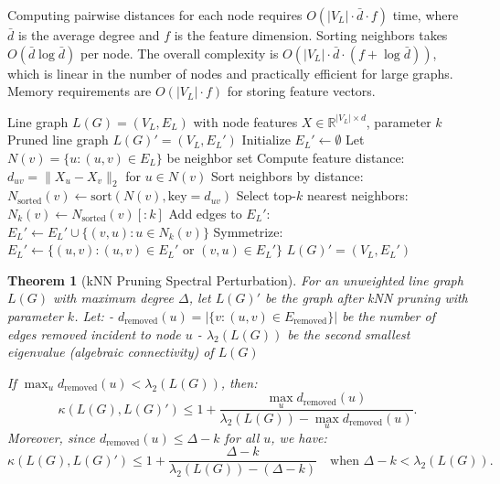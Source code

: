 \documentclass[pdflatex,sn-mathphys-num]{sn-jnl}%
\theoremstyle{thmstyleone}%
\newtheorem{theorem}{Theorem}%
\theoremstyle{thmstyletwo}%
\theoremstyle{thmstylethree}%
\theoremstyle{plain} %
\theoremstyle{definition} %
\theoremstyle{remark} %
\theoremstyle{plain} %
\begin{document}
Computing pairwise distances for each node requires $O(|V_L| \cdot \bar{d} \cdot f)$ time, where $\bar{d}$ is the average degree and $f$ is the feature dimension. Sorting neighbors takes $O(\bar{d} \log \bar{d})$ per node. The overall complexity is $O(|V_L| \cdot \bar{d} \cdot (f + \log \bar{d}))$, which is linear in the number of nodes and practically efficient for large graphs. Memory requirements are $O(|V_L| \cdot f)$ for storing feature vectors.

\begin{algorithm}[H]
\caption{kNN Spectral Pruning for Line Graphs}
\label{algo:knn_pruning}
\begin{algorithmic}[1]
\Require Line graph $L(G) = (V_L, E_L)$ with node features $X \in \mathbb{R}^{|V_L| \times d}$, parameter $k$
\Ensure Pruned line graph $L(G)' = (V_L, E_L')$
\State Initialize $E_L' \gets \emptyset$
    \State Let $N(v) = \{u : (u,v) \in E_L\}$ be neighbor set
    \State Compute feature distance: $d_{uv} = \|X_u - X_v\|_2$ for $u \in N(v)$
    \State Sort neighbors by distance: $N_{\text{sorted}}(v) \gets \text{sort}(N(v), \text{key}=d_{uv})$
    \State Select top-$k$ nearest neighbors: $N_k(v) \gets N_{\text{sorted}}(v)[:k]$
    \State Add edges to $E_L'$: $E_L' \gets E_L' \cup \{(v,u) : u \in N_k(v)\}$
\EndFor
\State Symmetrize: $E_L' \gets \{(u,v) : (u,v) \in E_L' \text{ or } (v,u) \in E_L'\}$
\State \Return $L(G)' = (V_L, E_L')$
\end{algorithmic}
\end{algorithm}

\begin{theorem}[kNN Pruning Spectral Perturbation]
For an unweighted line graph $L(G)$ with maximum degree $\Delta$, let $L(G)'$ be the graph after kNN pruning with parameter $k$. Let:
- $d_{\text{removed}}(u) = |\{v: (u,v) \in E_{\text{removed}}\}|$ be the number of edges removed incident to node $u$
- $\lambda_2(L(G))$ be the second smallest eigenvalue (algebraic connectivity) of $L(G)$

If $\max_u d_{\text{removed}}(u) < \lambda_2(L(G))$, then:
\[
\kappa(L(G), L(G)') \leq 1 + \frac{\max_u d_{\text{removed}}(u)}{\lambda_2(L(G)) - \max_u d_{\text{removed}}(u)}.
\]
Moreover, since $d_{\text{removed}}(u) \leq \Delta - k$ for all $u$, we have:
\[
\kappa(L(G), L(G)') \leq 1 + \frac{\Delta - k}{\lambda_2(L(G)) - (\Delta - k)} \quad \text{when } \Delta - k < \lambda_2(L(G)).
\]
\end{theorem}
\end{document}
